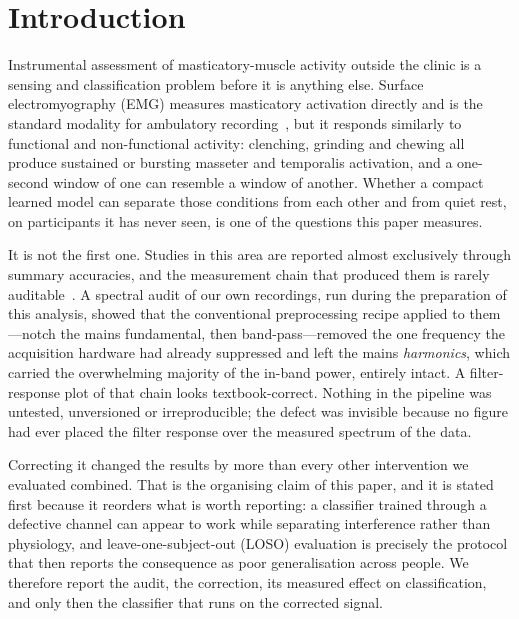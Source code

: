 \documentclass[pdflatex,sn-nature,iicol]{sn-jnl}
\begin{document}
\maketitle

\section{Introduction}

Instrumental assessment of masticatory-muscle activity outside the clinic is a sensing and classification problem before it is anything else. Surface electromyography (EMG) measures masticatory activation directly and is the standard modality for ambulatory recording~\cite{raez2006techniques,colonna2023electromyographic,thymi2021signal}, but it responds similarly to functional and non-functional activity: clenching, grinding and chewing all produce sustained or bursting masseter and temporalis activation, and a one-second window of one can resemble a window of another. Whether a compact learned model can separate those conditions from each other and from quiet rest, on participants it has never seen, is one of the questions this paper measures.

It is not the first one. Studies in this area are reported almost exclusively through summary accuracies, and the measurement chain that produced them is rarely auditable~\cite{thymi2021signal,cidverdejo2024instrumental}. A spectral audit of our own recordings, run during the preparation of this analysis, showed that the conventional preprocessing recipe applied to them---notch the mains fundamental, then band-pass---removed the one frequency the acquisition hardware had already suppressed and left the mains \emph{harmonics}, which carried the overwhelming majority of the in-band power, entirely intact. A filter-response plot of that chain looks textbook-correct. Nothing in the pipeline was untested, unversioned or irreproducible; the defect was invisible because no figure had ever placed the filter response over the measured spectrum of the data.

Correcting it changed the results by more than every other intervention we evaluated combined. That is the organising claim of this paper, and it is stated first because it reorders what is worth reporting: a classifier trained through a defective channel can appear to work while separating interference rather than physiology, and leave-one-subject-out (LOSO) evaluation is precisely the protocol that then reports the consequence as poor generalisation across people. We therefore report the audit, the correction, its measured effect on classification, and only then the classifier that runs on the corrected signal.
\end{document}
